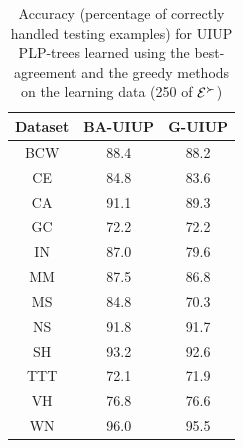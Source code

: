 {
	\begin{table}
	  \centering
	  \begin{tabular}{ |c||c|c| }
	    \hline
	    Dataset          & BA-UIUP & G-UIUP \\
	    \hline \hline                               
	    BCW              & 88.4   & 88.2     \\ \hline
	    CE               & 84.8   & 83.6     \\ \hline
	    CA               & 91.1   & 89.3     \\ \hline
	    GC               & 72.2   & 72.2     \\ \hline
	    IN               & 87.0   & 79.6     \\ \hline
	    MM               & 87.5   & 86.8     \\ \hline
	    MS               & 84.8   & 70.3     \\ \hline
	    NS               & 91.8   & 91.7     \\ \hline
	    SH               & 93.2   & 92.6     \\ \hline
	    TTT              & 72.1   & 71.9     \\ \hline
	    VH               & 76.8   & 76.6     \\ \hline
	    WN               & 96.0   & 95.5     \\ \hline
	  \end{tabular}
	  \caption{Accuracy (percentage of correctly handled testing examples)
						 for UIUP PLP-trees learned using the best-agreement and
						 the greedy methods on the learning 
						 data (250 of $\mathcal{E}^\succ$)}
	  \label{tbl:trees1}
	\end{table}
}

